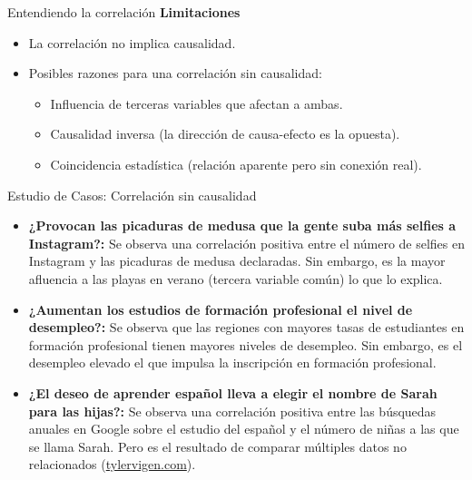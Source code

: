 ﻿\documentclass{beamer}
\begin{document}
\begin{frame}{Entendiendo la correlación}
    \textbf{Limitaciones}
    \begin{itemize}
        \item La correlación no implica causalidad.
        \item Posibles razones para una correlación sin causalidad:
            \begin{itemize}
                \item Influencia de terceras variables que afectan a ambas.
                \item Causalidad inversa (la dirección de causa-efecto es la opuesta).
                \item Coincidencia estadística (relación aparente pero sin conexión real).
            \end{itemize}
    \end{itemize}
\end{frame}


\begin{frame}{Estudio de Casos: Correlación sin causalidad}

\begin{itemize}
    \item \textbf{¿Provocan las picaduras de medusa que la gente suba más selfies a Instagram?:} Se observa una correlación positiva entre el número de selfies en Instagram y las picaduras de medusa declaradas. Sin embargo, es la mayor afluencia a las playas en verano (tercera variable común) lo que lo explica.

    \item \textbf{¿Aumentan los estudios de formación profesional el nivel de desempleo?:}  
    Se observa que las regiones con mayores tasas de estudiantes en formación profesional tienen mayores niveles de desempleo. Sin embargo, es el desempleo elevado el que impulsa la inscripción en formación profesional.

    \item \textbf{¿El deseo de aprender español lleva a elegir el nombre de Sarah para las hijas?:}  
   Se observa una correlación positiva entre las búsquedas anuales en Google sobre el estudio del español y el número de niñas a las que se llama Sarah. Pero es el resultado de comparar múltiples datos no relacionados (\href{https://tylervigen.com/spurious-correlations}{tylervigen.com}).
\end{itemize}

\end{frame}
\end{document}
